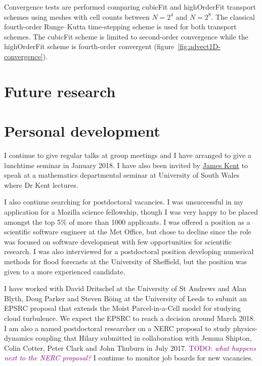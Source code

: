 \documentclass[a4paper,11pt]{article}
\newcommand{\TODO}[1]{\textcolor{purple}{TODO: \emph{#1}}}
\begin{document}
Convergence tests are performed comparing cubicFit and highOrderFit transport schemes using meshes with cell counts between $N = 2^4$ and $N = 2^8$.  The classical fourth-order Runge--Kutta time-stepping scheme \citep[p. 53]{durran2013} is used for both transport schemes.  The cubicFit scheme is limited to second-order convergence while the highOrderFit scheme is fourth-order convergent (figure~\ref{fig:advect1D-convergence}).

\section{Future research}


\section{Personal development}

I continue to give regular talks at group meetings and I have arranged to give a lunchtime seminar in January 2018.
I have also been invited by \href{http://staff.southwales.ac.uk/users/8005-jkent}{James Kent} to speak at a mathematics departmental seminar at University of South Wales where Dr Kent lectures.

I also continue searching for postdoctoral vacancies.
I was unsuccessful in my application for a Mozilla science fellowship, though I was very happy to be placed amongst the top 5\% of more than 1000 applicants.
I was offered a position as a scientific software engineer at the Met Office, but chose to decline since the role was focused on software development with few opportunities for scientific research.
I was also interviewed for a postdoctoral position developing numerical methods for flood forecasts at the University of Sheffield, but the position was given to a more experienced candidate.

I have worked with David Dritschel at the University of St Andrews and Alan Blyth, Doug Parker and Steven B\"{o}ing at the University of Leeds to submit an EPSRC proposal that extends the Moist Parcel-in-a-Cell model \citep{boeing2017} for studying cloud turbulence.  We expect the EPSRC to reach a decision around March 2018.
I am also a named postdoctoral researcher on a NERC proposal to study physics-dynamics coupling that Hilary submitted in collaboration with Jemma Shipton, Colin Cotter, Peter Clark and John Thuburn in July 2017.
\TODO{what happens next to the NERC proposal?}
I continue to monitor job boards for new vacancies.
\end{document}
